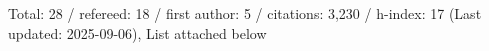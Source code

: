 Total: 28 / refereed: 18 / first author: 5 / citations: 3,230 / h-index: 17 (Last updated: 2025-09-06), List attached below